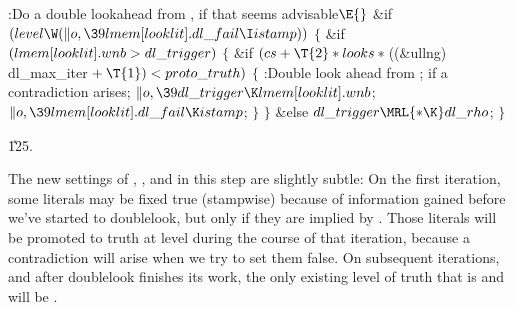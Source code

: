 \B{}:Do a double lookahead from , if
that seems advisable\X${}\E{}$\6
\&{if} ${}(\\{level}\W(\|o,\39\\{lmem}[\\{looklit}].\\{dl\_fail}\I%
\\{istamp})){}$\5
${}\{{}$\1\6
\&{if} ${}(\\{lmem}[\\{looklit}].\\{wnb}>\\{dl\_trigger}){}$\5
${}\{{}$\1\6
\&{if} ${}(\\{cs}+\T{2}*\\{looks}*{}$((\&{ullng}) \\{dl\_max\_iter}${}+\T{1})<%
\\{proto\_truth}){}$\5
${}\{{}$\1\6
:Double look ahead from ;  if a
contradiction arises\X;\6
${}\|o,\39\\{dl\_trigger}\K\\{lmem}[\\{looklit}].\\{wnb}{}$;\6
${}\|o,\39\\{lmem}[\\{looklit}].\\{dl\_fail}\K\\{istamp}{}$;\6
\4${}\}{}$\2\6
\4${}\}{}$\5
\2\&{else}\1\5
${}\\{dl\_trigger}\MRL{*{\K}}\\{dl\_rho}{}$;\2\6
\4${}\}{}$\2\par
\U125.\fi

The new settings of , ,
and  in this step
are slightly subtle: On the first iteration, some literals may be fixed true
(stampwise) because of information gained before we've started to doublelook,
but only if they are implied by . Those literals will be
promoted
to truth at level  during the course of that iteration,
because a contradiction will arise when we try to set them false.
On subsequent iterations, and after doublelook finishes its work, the only
existing level of truth that is  and  will be .

